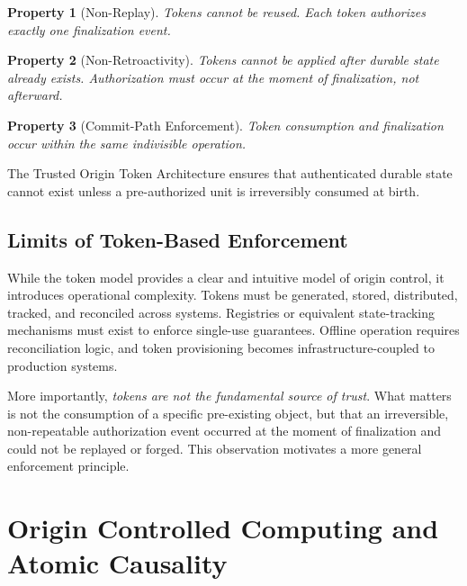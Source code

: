 \documentclass[11pt,letterpaper]{article}
\theoremstyle{occplain}
\theoremstyle{occremark}
\newtheorem{property}{Property}[section]
\begin{document}
\begin{property}[Non-Replay]
\label{prop:non-replay}
Tokens cannot be reused. Each token authorizes exactly one finalization event.
\end{property}

\begin{property}[Non-Retroactivity]
\label{prop:non-retroactivity}
Tokens cannot be applied after durable state already exists. Authorization must occur at the moment of finalization, not afterward.
\end{property}

\begin{property}[Commit-Path Enforcement]
\label{prop:commit-path}
Token consumption and finalization occur within the same indivisible operation.
\end{property}

The Trusted Origin Token Architecture ensures that authenticated durable state cannot exist unless a pre-authorized unit is irreversibly consumed at birth.


\subsection{Limits of Token-Based Enforcement}
\label{sec:limits-token}

While the token model provides a clear and intuitive model of origin control, it introduces operational complexity. Tokens must be generated, stored, distributed, tracked, and reconciled across systems. Registries or equivalent state-tracking mechanisms must exist to enforce single-use guarantees. Offline operation requires reconciliation logic, and token provisioning becomes infrastructure-coupled to production systems.

More importantly, \emph{tokens are not the fundamental source of trust}. What matters is not the consumption of a specific pre-existing object, but that an irreversible, non-repeatable authorization event occurred at the moment of finalization and could not be replayed or forged. This observation motivates a more general enforcement principle.


\section{Origin Controlled Computing and Atomic Causality}
\label{sec:occ}
\end{document}
